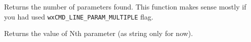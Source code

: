 
Returns the number of parameters found. This function makes sense mostly if you
had used {\tt wxCMD\_LINE\_PARAM\_MULTIPLE} flag.

\label{wxcmdlineparsergetparam}


Returns the value of Nth parameter (as string only for now).



